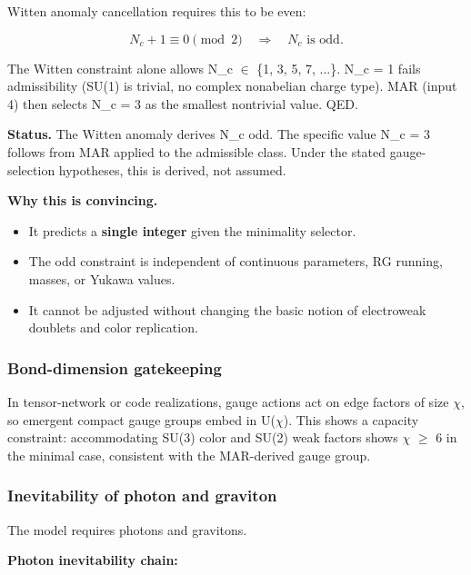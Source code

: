 Witten anomaly cancellation requires this to be even:

\[
N_c + 1 \equiv 0 \pmod{2} \quad \Rightarrow \quad N_c \text{ is odd}.
\]

The Witten constraint alone allows N\_c \ensuremath{\in} \{1, 3, 5, 7, ...\}. N\_c = 1 fails admissibility (SU(1) is trivial, no complex nonabelian charge type). MAR (input 4) then selects N\_c = 3 as the smallest nontrivial value. QED.

\textbf{Status.} The Witten anomaly derives N\_c odd. The specific value N\_c = 3 follows from MAR applied to the admissible class. Under the stated gauge-selection hypotheses, this is derived, not assumed.

\textbf{Why this is convincing.}

\begin{itemize}
\tightlist
\item
  It predicts a \textbf{single integer} given the minimality selector.
\item
  The odd constraint is independent of continuous parameters, RG running, masses, or Yukawa values.
\item
  It cannot be adjusted without changing the basic notion of electroweak doublets and color replication.
\end{itemize}

\subsubsection{Bond-dimension gatekeeping}\label{610-bond-dimension-gatekeeping}

In tensor-network or code realizations, gauge actions act on edge factors of size \ensuremath{\chi}, so emergent compact gauge groups embed in U(\ensuremath{\chi}). This shows a capacity constraint: accommodating SU(3) color and SU(2) weak factors shows \ensuremath{\chi} \ensuremath{\geq} 6 in the minimal case, consistent with the MAR-derived gauge group.

\subsubsection{Inevitability of photon and graviton}\label{611-inevitability-of-photon-and-graviton}

The model requires photons and gravitons.

\textbf{Photon inevitability chain:}

